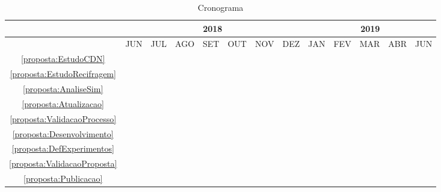 \begin{table}[!htbp]
    \centering
    \begin{tabular}{|c|c|c|c|c|c|c|c|c|c|c|c|c|}
    \hline
    & \multicolumn{7}{c|}{2018}&\multicolumn{5}{c|}{2019} \\
    \hline
    & JUN&JUL&AGO&SET&OUT&NOV&DEZ&JAN&FEV&MAR&ABR&JUN \\
    \hline
    \ref{proposta:EstudoCDN}&\cellcolor{STC}&\cellcolor{STC}&&&&&&&&&& \\
    \hline
    \ref{proposta:EstudoRecifragem} &&&\cellcolor{STC}&\cellcolor{STC}&&&&&&&& \\
    \hline
    \ref{proposta:AnaliseSim} &&&&&\cellcolor{STC}&&&&&&& \\
    \hline
    \ref{proposta:Atualizacao} &&&&&&\cellcolor{STC}&\cellcolor{STC}&&&&& \\
    \hline
    \ref{proposta:ValidacaoProcesso} &&&&&&&&\cellcolor{STC}&&&& \\
    \hline
    \ref{proposta:Desenvolvimento} &&&&&&&&\cellcolor{STC}&\cellcolor{STC}&&& \\
    \hline
    \ref{proposta:DefExperimentos} &&&&&&&&&&\cellcolor{STC}&& \\
    \hline
    \ref{proposta:ValidacaoProposta} &&&&&&&&&&\cellcolor{STC}&& \\
    \hline
    \ref{proposta:Publicacao} &&&&&&&&&&&\cellcolor{STC}&\cellcolor{STC} \\
    \hline
    \end{tabular}
    \caption{Cronograma}
    \label{tab:cronograma}
\end{table}
